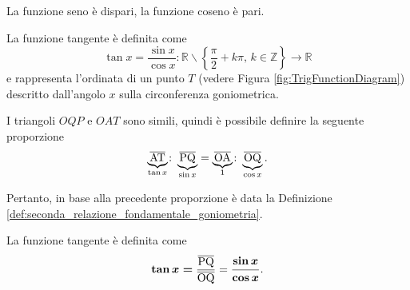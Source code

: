 \begin{property}
    La funzione seno è dispari, la funzione coseno è pari.
\end{property}

\begin{definition}[Tangente]
    La funzione tangente è definita come
    \begin{equation*}
        \tan x=\frac{\sin x}{\cos x}\colon \mathbb R\backslash\left\{\frac{\pi}{2}+k\pi,\,k\in\mathbb Z\right\}\rightarrow\mathbb R
    \end{equation*}
    e rappresenta l'ordinata di un punto $T$ (vedere Figura \ref{fig:TrigFunctionDiagram}) descritto dall'angolo $x$ sulla circonferenza goniometrica. 
\end{definition}

I triangoli $OQP$ e $OAT$ sono simili, quindi è possibile definire la seguente proporzione
\begin{equation*}
    \underbrace{\overline{\rm AT}}_{\tan x}\colon\underbrace{\overline{\rm PQ}}_{\sin x}=\underbrace{\overline{\rm OA}}_{1}\colon\underbrace{\overline{\rm OQ}}_{\cos x}.
\end{equation*}

Pertanto, in base alla precedente proporzione è data la Definizione \ref{def:seconda_relazione_fondamentale_goniometria}.

\begin{definition}\label{def:seconda_relazione_fondamentale_goniometria}
La funzione tangente è definita come
    \begin{equation}\label{eq:seconda_relazione_fondamentale_goniometria}
        \boldsymbol{\tan x=}\frac{\overline{\rm PQ}}{\overline{\rm OQ}}=\boldsymbol{\frac{\sin x}{\cos x}}.
    \end{equation}
\end{definition}

